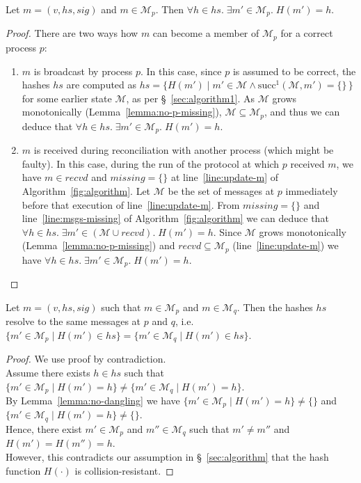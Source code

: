 \documentclass[a4paper,anonymous,USenglish]{lipics-v2019}
\begin{document}
\begin{lemma}\label{lemma:no-dangling}
Let $m = (v, \mathit{hs}, \mathit{sig})$ and $m \in \mathcal{M}_p$.
Then $\forall h \in \mathit{hs}.\; \exists m' \in \mathcal{M}_p.\; H(m') = h$.
\end{lemma}
\begin{proof}
There are two ways how $m$ can become a member of $\mathcal{M}_p$ for a correct process $p$:
\begin{enumerate}
    \item $m$ is broadcast by process $p$.
    In this case, since $p$ is assumed to be correct, the hashes $\mathit{hs}$ are computed as $\mathit{hs} = \{H(m') \mid m' \in \mathcal{M} \wedge \mathrm{succ}^1(\mathcal{M}, m') = \{\}\,\}$ for some earlier state $\mathcal{M}$, as per \S~\ref{sec:algorithm1}.
    As $\mathcal{M}$ grows monotonically (Lemma~\ref{lemma:no-p-missing}), $\mathcal{M} \subseteq \mathcal{M}_p$, and thus we can deduce that $\forall h \in \mathit{hs}.\; \exists m' \in \mathcal{M}_p.\; H(m') = h$.
    \item $m$ is received during reconciliation with another process (which might be faulty).
    In this case, during the run of the protocol at which $p$ received $m$, we have $m \in \mathit{recvd}$ and $\mathit{missing} = \{\}$ at line~\ref{line:update-m} of Algorithm~\ref{fig:algorithm}.
    Let $\mathcal{M}$ be the set of messages at $p$ immediately before that execution of line~\ref{line:update-m}.
    From $\mathit{missing} = \{\}$ and line~\ref{line:msgs-missing} of Algorithm~\ref{fig:algorithm} we can deduce that $\forall h \in \mathit{hs}.\; \exists m' \in (\mathcal{M} \cup \mathit{recvd}).\; H(m') = h$.
    Since $\mathcal{M}$ grows monotonically (Lemma~\ref{lemma:no-p-missing}) and $\mathit{recvd} \subseteq \mathcal{M}_p$ (line~\ref{line:update-m}) we have $\forall h \in \mathit{hs}.\; \exists m' \in \mathcal{M}_p.\; H(m') = h$.
\end{enumerate}
\end{proof}

\begin{lemma}\label{lemma:no-collision}
Let $m = (v, \mathit{hs}, \mathit{sig})$ such that $m \in \mathcal{M}_p$ and $m \in \mathcal{M}_q$.
Then the hashes $\mathit{hs}$ resolve to the same messages at $p$ and $q$, i.e.\ $\{m' \in \mathcal{M}_p \mid H(m') \in \mathit{hs}\} = \{m' \in \mathcal{M}_q \mid H(m') \in \mathit{hs}\}$.
\end{lemma}
\begin{proof}
We use proof by contradiction.\\
Assume there exists $h \in \mathit{hs}$ such that $\{m' \in \mathcal{M}_p \mid H(m') = h\} \neq \{m' \in \mathcal{M}_q \mid H(m') = h\}$.\\
By Lemma~\ref{lemma:no-dangling} we have $\{m' \in \mathcal{M}_p \mid H(m') = h\} \neq \{\}$ and $\{m' \in \mathcal{M}_q \mid H(m') = h\} \neq \{\}$.\\
Hence, there exist $m' \in \mathcal{M}_p$ and $m'' \in \mathcal{M}_q$ such that $m' \neq m''$ and $H(m') = H(m'') = h$.\\
However, this contradicts our assumption in \S~\ref{sec:algorithm} that the hash function $H(\cdot)$ is collision-resistant.
\end{proof}
\end{document}
